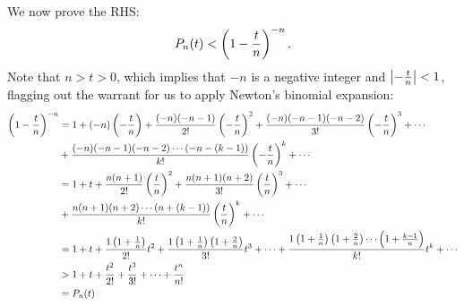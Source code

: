 \begin{enumerate}
\begin{solution}
\begin{enumerate}[label=(\roman*)]
\

We now prove the RHS:
\[ P_n(t)<\left(1-\frac{t}{n}\right)^{-n}. \]
Note that $n>t>0$, which implies that $-n$ is a negative integer and $\left|-\frac{t}{n}\right|<1$, flagging out the warrant for us to apply Newton's binomial expansion:
\begin{align*}
\left(1-\frac{t}{n}\right)^{-n}&=1+(-n)\left(-\frac{t}{n}\right)+\frac{(-n)(-n-1)}{2!}\left(-\frac{t}{n}\right)^2+\frac{(-n)(-n-1)(-n-2)}{3!}\left(-\frac{t}{n}\right)^3+\cdots\\
& +\frac{(-n)(-n-1)(-n-2)\cdots(-n-(k-1))}{k!}\left(-\frac{t}{n}\right)^k+\cdots\\
&=1+t+\frac{n(n+1)}{2!}\left(\frac{t}{n}\right)^2+\frac{n(n+1)(n+2)}{3!}\left(\frac{t}{n}\right)^3+\cdots\\
&+\frac{n(n+1)(n+2)\cdots(n+(k-1))}{k!}\left(\frac{t}{n}\right)^k+\cdots\\
&=1+t+\frac{1\left(1+\frac{1}{n}\right)}{2!}t^2+\frac{1\left(1+\frac{1}{n}\right)\left(1+\frac{2}{n}\right)}{3!}t^3+\cdots+\frac{1\left(1+\frac{1}{n}\right)\left(1+\frac{2}{n}\right)\cdots\left(1+\frac{k-1}{n}\right)}{k!}t^k+\cdots\\
&>1+t+\frac{t^2}{2!}+\frac{t^3}{3!}+\cdots+\frac{t^n}{n!}\\
&=P_n(t)
\end{align*}
\end{enumerate}
\end{solution}

\end{enumerate}
\pagebreak

